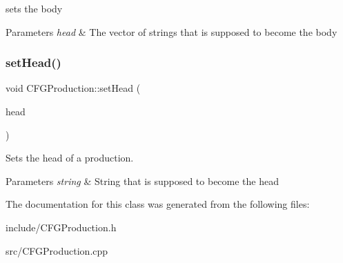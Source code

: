 sets the body 


\begin{DoxyParams}{Parameters}
{\em head} & The vector of strings that is supposed to become the body \\
\hline
\end{DoxyParams}
\mbox{\label{classCFGProduction_a031e16a88f4de0107852494a17a764b1}} 
\subsubsection{\texorpdfstring{set\+Head()}{setHead()}}
{\footnotesize\ttfamily void C\+F\+G\+Production\+::set\+Head (\begin{DoxyParamCaption}\item[{const std\+::string \&}]{head }\end{DoxyParamCaption})}



Sets the head of a production. 


\begin{DoxyParams}{Parameters}
{\em string} & String that is supposed to become the head \\
\hline
\end{DoxyParams}


The documentation for this class was generated from the following files\+:\begin{DoxyCompactItemize}
\item 
include/C\+F\+G\+Production.\+h\item 
src/C\+F\+G\+Production.\+cpp\end{DoxyCompactItemize}
